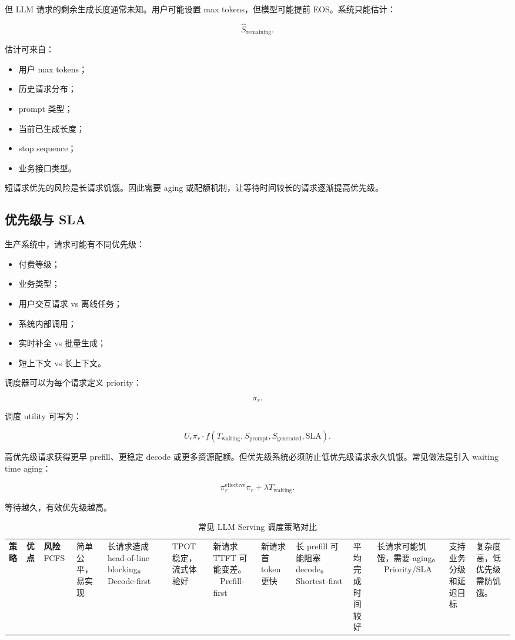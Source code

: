 但 LLM 请求的剩余生成长度通常未知。用户可能设置 max tokens，但模型可能提前 EOS。系统只能估计：

\[
\hat{S}_{\mathrm{remaining}}.
\]

估计可来自：

\begin{itemize}
\item 用户 max tokens；
\item 历史请求分布；
\item prompt 类型；
\item 当前已生成长度；
\item stop sequence；
\item 业务接口类型。
\end{itemize}

短请求优先的风险是长请求饥饿。因此需要 aging 或配额机制，让等待时间较长的请求逐渐提高优先级。

\subsection{优先级与 SLA}
\label{subsec:priority-and-sla}

生产系统中，请求可能有不同优先级：

\begin{itemize}
\item 付费等级；
\item 业务类型；
\item 用户交互请求 vs 离线任务；
\item 系统内部调用；
\item 实时补全 vs 批量生成；
\item 短上下文 vs 长上下文。
\end{itemize}

调度器可以为每个请求定义 priority：

\[
\pi_r.
\]

调度 utility 可写为：

\[
U_r
\pi_r
\cdot
f(T_{\mathrm{waiting}},S_{\mathrm{prompt}},S_{\mathrm{generated}},\mathrm{SLA}).
\]

高优先级请求获得更早 prefill、更稳定 decode 或更多资源配额。但优先级系统必须防止低优先级请求永久饥饿。常见做法是引入 waiting time aging：

\[
\pi_r^{\mathrm{effective}}
\pi_r
+
\lambda T_{\mathrm{waiting}}.
\]

等待越久，有效优先级越高。

\begin{table}[H]
\centering
\small
\caption{常见 LLM Serving 调度策略对比}
\label{tab:serving-scheduling-policies}
\begin{tabular}{p{}p{}p{}}
\toprule
\textbf{策略} & \textbf{优点} & \textbf{风险} \
\midrule
FCFS
& 简单公平，易实现
& 长请求造成 head-of-line blocking。 \
\midrule
Decode-first
& TPOT 稳定，流式体验好
& 新请求 TTFT 可能变差。 \
\midrule
Prefill-first
& 新请求首 token 更快
& 长 prefill 可能阻塞 decode。 \
\midrule
Shortest-first
& 平均完成时间较好
& 长请求可能饥饿，需要 aging。 \
\midrule
Priority/SLA
& 支持业务分级和延迟目标
& 复杂度高，低优先级需防饥饿。 \
\bottomrule
\end{tabular}
\end{table}

